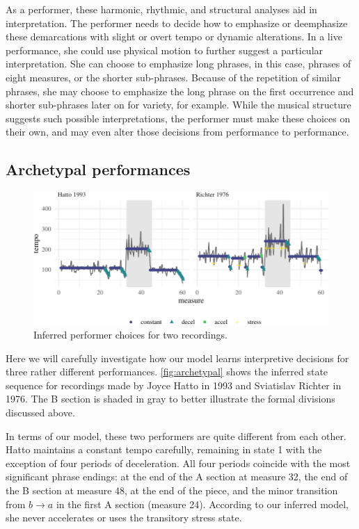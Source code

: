 \documentclass[aoas]{imsart}
\begin{document}
As a performer, these harmonic, rhythmic, and structural analyses aid
in interpretation. The performer needs to decide how to emphasize or
deemphasize these demarcations with slight or overt tempo or dynamic
alterations. In a live performance, she could use physical motion to
further suggest a particular interpretation. She can choose to
emphasize long phrases, in this 
case, phrases of eight measures, or the shorter sub-phrases. Because
of the repetition of similar phrases, she may choose to emphasize the
long phrase on the first occurrence and shorter sub-phrases later on
for variety, for example. While the musical structure suggests such
possible interpretations, the performer must make these choices on
their own, and may even alter those decisions from performance to
performance.



\subsection{Archetypal performances}
\label{sec:arch-perf}


\begin{figure}[t]
  \centering
  \includegraphics[width=.9\textwidth]{two-performances-1}
  \caption{Inferred performer choices for two recordings. }
  \label{fig:archetypal}
\end{figure}
Here we will carefully investigate how our model learns interpretive
decisions for three rather different performances. \autoref{fig:archetypal} shows the inferred state sequence for
recordings made by Joyce Hatto in 1993 and Sviatislav Richter in
1976. The B section is
shaded in gray to better illustrate the formal divisions discussed above.

In terms of our model, these two performers are quite different
from each other. Hatto maintains a constant tempo carefully, remaining
in state 1 with the exception of four periods of deceleration. All
four periods coincide with the most significant phrase endings: at the
end of the A section at measure 32, the end of the B section at
measure 48, at the end of the piece, and the minor transition from
$b\rightarrow a$ in the first A section (measure 24). According
to our inferred model, she never accelerates or uses the transitory
stress state.
\end{document}
